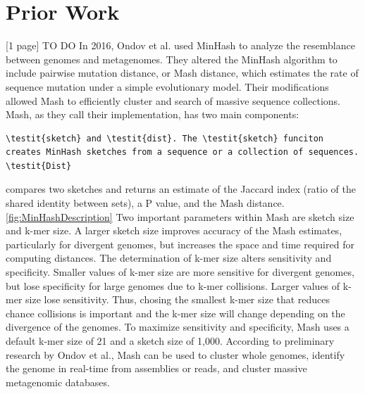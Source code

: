 \documentclass[12pt, letterpaper]{article}
\begin{document}
\section{Prior Work}

[1 page] \color{red} TO DO \color{black} In 2016, Ondov et al. used MinHash to analyze the resemblance between genomes and metagenomes\cite{MinHash}. They altered the MinHash algorithm to include pairwise mutation distance, or Mash distance, which estimates the rate of sequence mutation under a simple evolutionary model. Their modifications allowed Mash to efficiently cluster and search of massive sequence collections. Mash, as they call their implementation, has two main components: \begin{verbatim}\testit{sketch} and \testit{dist}. The \testit{sketch} funciton creates MinHash sketches from a sequence or a collection of sequences. \testit{Dist} \end{verbatim} compares two sketches and returns an estimate of the Jaccard index (ratio of the shared identity between sets), a P value, and the Mash distance.\ref{fig:MinHashDescription} Two important parameters within Mash are sketch size and k-mer size. A larger sketch size improves accuracy of the Mash estimates, particularly for divergent genomes, but increases the space and time required for computing distances. The determination of k-mer size alters sensitivity and specificity. Smaller values of k-mer size are more sensitive for divergent genomes, but lose specificity for large genomes due to k-mer collisions. Larger values of k-mer size lose sensitivity. Thus, chosing the smallest k-mer size that reduces chance collisions is important and the k-mer size will change depending on the divergence of the genomes. To maximize sensitivity and specificity, Mash uses a default k-mer size of 21 and a sketch size of 1,000. According to preliminary research by Ondov et al., Mash can be used to cluster whole genomes, identify the genome in real-time  from assemblies or reads, and cluster massive metagenomic databases.
\end{document}
